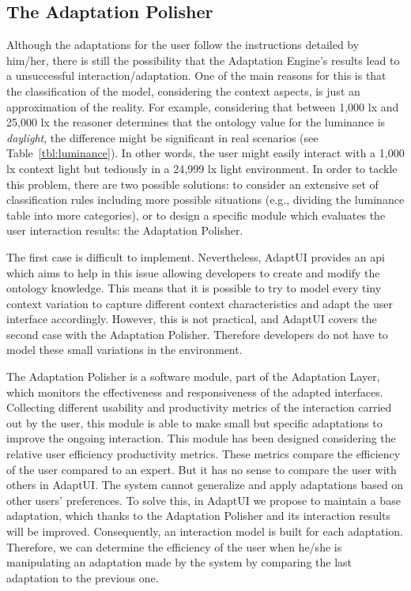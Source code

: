 \subsection{The Adaptation Polisher}
\label{sec:adaptation_polisher}

Although the adaptations for the user follow the instructions detailed by him/her,
there is still the possibility that the Adaptation Engine's results lead to a
unsuccessful interaction/adaptation. One of the main reasons for this is that
the classification of the model, considering the context aspects, is just an
approximation of the reality. For example, considering that between 1,000 \ac{lx} and
25,000 \ac{lx} the reasoner determines that the ontology value for the luminance
is \textit{daylight}, the difference might be significant in real scenarios
(see Table~\ref{tbl:luminance}). In other words, the user might easily interact
with a 1,000 \ac{lx} context light but tediously in a 24,999 \ac{lx} light environment. In
order to tackle this problem, there are two possible solutions: to consider
an extensive set of classification rules including more possible situations (e.g.,
dividing the luminance table into more categories), or to design a specific
module which evaluates the user interaction results: the Adaptation Polisher.

The first case is difficult to implement. Nevertheless, AdaptUI provides an \ac{api}
which aims to help in this issue allowing developers to create and modify the
ontology knowledge. This means that it is possible to try to model every tiny
context variation to capture different context characteristics and adapt the user
interface accordingly. However, this is not practical, and AdaptUI covers the
second case with the Adaptation Polisher. Therefore developers do not have to
model these small variations in the environment.

The Adaptation Polisher is a software module, part of the Adaptation Layer, which
monitors the effectiveness and responsiveness of the adapted interfaces. Collecting
different usability and productivity metrics of the interaction carried out by the
user, this module is able to make small but specific adaptations to improve
the ongoing interaction. This module has been designed considering the relative
user efficiency productivity metrics. These metrics compare the efficiency of the
user compared to an expert. But it has no sense to compare the user with others
in AdaptUI. The system cannot generalize and apply adaptations based on other
users' preferences. To solve this, in AdaptUI we propose to maintain a base
adaptation, which thanks to the Adaptation Polisher and its interaction results
will be improved. Consequently, an interaction model is built for each adaptation.
Therefore, we can determine the efficiency of the user when he/she is manipulating
an adaptation made by the system by comparing the last adaptation to the previous
one.

